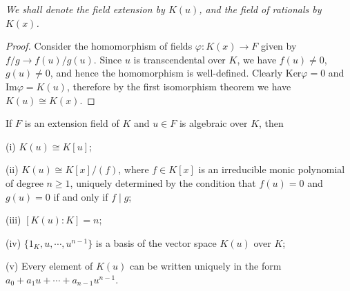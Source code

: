 \begin{note}\em
We shall denote the field extension by $K(u)$, and the field of rationals by $K(x)$.
\end{note}
\begin{proof}
Consider the homomorphism of fields $\varphi:K(x)\to F$ given by $f/g\to f(u)/g(u)$. Since $u$ is transcendental over $K$, we have $f(u)\ne 0$, $g(u)\ne 0$, and hence the homomorphism is well-defined. Clearly $\mathrm{Ker}\varphi=0$ and $\mathrm{Im}\varphi=K(u)$, therefore by the first isomorphism theorem we have $K(u)\cong K(x)$.
\end{proof}
\begin{theorem}
If $F$ is an extension field of $K$ and $u\in F$ is algebraic over $K$, then \par
(i) $K(u)\cong K[u]$;\par
(ii) $K(u)\cong K[x]/(f)$, where $f\in K[x]$ is an irreducible monic polynomial of degree $n\ge 1$, uniquely determined by the condition that $f(u)=0$ and $g(u)=0$ if and only if $f\mid g$;\par
(iii) $[K(u):K]=n$;\par
(iv) $\{1_K,u,\cdots,u^{n-1}\}$ is a basis of the vector space $K(u)$ over $K$;\par
(v) Every element of $K(u)$ can be written uniquely in the form $a_0+a_1u+\cdots+a_{n-1}u^{n-1}$.
\end{theorem}
